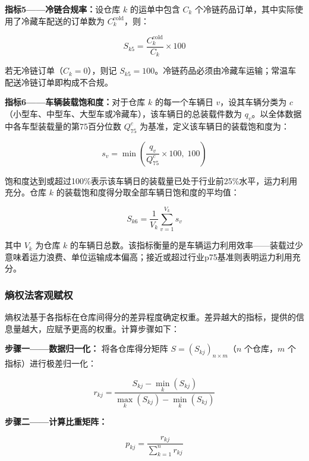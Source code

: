 {\bf 指标5——冷链合规率：}设仓库 $k$ 的运单中包含 $C_k$ 个冷链药品订单，其中实际使用了冷藏车配送的订单数为 $C_k^{\text{cold}}$，则：

\begin{equation}\label{eq:score_s5}
S_{k5} = \frac{C_k^{\text{cold}}}{C_k} \times 100
\end{equation}

若无冷链订单（$C_k = 0$），则记 $S_{k5} = 100$。冷链药品必须由冷藏车运输；常温车配送冷链订单即构成不合规。

{\bf 指标6——车辆装载饱和度：}对于仓库 $k$ 的每一个车辆日 $v$，设其车辆分类为 $c$（小型车、中型车、大型车或冷藏车），该车辆日的总装载件数为 $q_v$。以全体数据中各车型装载量的第75百分位数 $Q_{75}^c$ 为基准，定义该车辆日的装载饱和度为：

\begin{equation}\label{eq:load_sat}
s_v = \min\!\left(\frac{q_v}{Q_{75}^c} \times 100,\; 100\right)
\end{equation}

饱和度达到或超过100\%表示该车辆日的装载量已处于行业前25\%水平，运力利用充分。仓库 $k$ 的装载饱和度得分取全部车辆日饱和度的平均值：

\begin{equation}\label{eq:score_s6}
S_{k6} = \frac{1}{V_k} \sum_{v=1}^{V_k} s_v
\end{equation}

其中 $V_k$ 为仓库 $k$ 的车辆日总数。该指标衡量的是车辆运力利用效率——装载过少意味着运力浪费、单位运输成本偏高；接近或超过行业p75基准则表明运力利用充分。

\subsubsection{熵权法客观赋权}

熵权法基于各指标在仓库间得分的差异程度确定权重。差异越大的指标，提供的信息量越大，应赋予更高的权重\cite{shannon1948mathematical,郭显光1998熵权}。计算步骤如下：

\textbf{步骤一——数据归一化：} 将各仓库得分矩阵 $S = (S_{kj})_{n \times m}$（$n$ 个仓库，$m$ 个指标）进行极差归一化：

\begin{equation}\label{eq:normalize}
r_{kj} = \frac{S_{kj} - \min_k(S_{kj})}{\max_k(S_{kj}) - \min_k(S_{kj})}
\end{equation}

\textbf{步骤二——计算比重矩阵：}

\begin{equation}\label{eq:proportion}
p_{kj} = \frac{r_{kj}}{\sum_{k=1}^{n} r_{kj}}
\end{equation}

